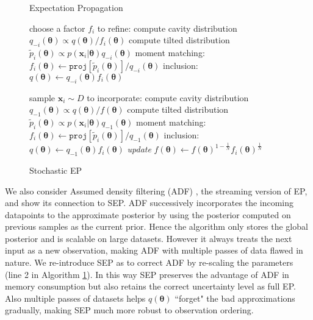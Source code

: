 \begin{figure}[!t]
%
\begin{minipage}[t]{0.45\linewidth}
\centering
\begin{algorithm}[H] 
\caption{Expectation Propagation} 
\label{alg:ep} 
\begin{algorithmic}[1] 
	\STATE choose a factor $f_i$ to refine:
	\STATE compute cavity distribution \\$q_{-i}(\bm{\theta}) \propto q(\bm{\theta}) / f_i(\bm{\theta})$
	\STATE compute tilted distribution \\$\tilde{p}_i(\bm{\theta}) \propto p(\bm{x}_i|\bm{\theta}) q_{-i}(\bm{\theta})$
	\STATE moment matching: \\$f_i(\bm{\theta}) \leftarrow \mathtt{proj}[\tilde{p}_i(\bm{\theta})] / q_{-i}(\bm{\theta}) $
	\STATE inclusion: $q(\bm{\theta}) \leftarrow q_{-i}(\bm{\theta}) f_i(\bm{\theta})$
\end{algorithmic}
\end{algorithm}
\end{minipage}
\quad \quad
\begin{minipage}[t]{0.45\linewidth}
\centering
\begin{algorithm}[H]
\caption{Stochastic EP} 
\label{alg:sep} 
\begin{algorithmic}[1] 
	\STATE sample $\bm{x}_i \sim D$ to incorporate:
	\STATE compute cavity distribution \\ $q_{-1}(\bm{\theta}) \propto q(\bm{\theta}) / f(\bm{\theta})$
	\STATE compute tilted distribution \\$\tilde{p}_i(\bm{\theta}) \propto p(\bm{x}_i|\bm{\theta}) q_{-1}(\bm{\theta})$
	\STATE moment matching: \\$f_i(\bm{\theta}) \leftarrow \mathtt{proj}[\tilde{p}_i(\bm{\theta})] / q_{-1}(\bm{\theta}) $
	\STATE inclusion: $q(\bm{\theta}) \leftarrow q_{-1}(\bm{\theta}) f_i(\bm{\theta})$
	\STATE \textit{update} $f(\bm{\theta}) \leftarrow f(\bm{\theta})^{1 - \frac{1}{N}} f_i(\bm{\theta})^{\frac{1}{N}}$
\end{algorithmic}
\end{algorithm}
\end{minipage} 
%
\end{figure}

%
We also consider Assumed density filtering (ADF) \cite{maybeck:adf}\cite{minka:ep}, the streaming version of EP, and show its connection to SEP. ADF successively incorporates the incoming datapoints to the approximate posterior by using the posterior computed on previous samples as the current prior. Hence the algorithm only stores the global posterior and is scalable on large datasets. However it always treats the next input as a new observation, making ADF with multiple passes of data flawed in nature. 
%
We re-introduce SEP as to correct ADF by re-scaling the parameters (line 2 in Algorithm \ref{alg:sep}). In this way SEP preserves the advantage of ADF in memory consumption but also retains the correct uncertainty level as full EP. Also multiple passes of datasets helps $q(\bm{\theta})$ ``forget" the bad approximations gradually, making SEP much more robust to observation ordering. 